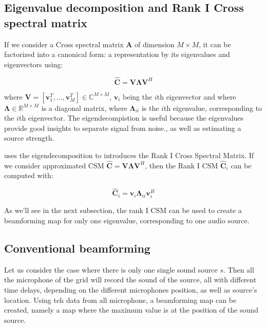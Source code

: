 \documentclass{article}
\begin{document}
\subsection{Eigenvalue decomposition and Rank I Cross spectral matrix}

If we consider a Cross spectral matrix $\mathbf{A}$ of dimension $M \times M$, it can be factorized into a canonical form: a representation by its eigenvalues and eigenvectors using:

\begin{equation}
    \hat{\mathbf{C}} = \mathbf{V} \mathbf{\Lambda} \mathbf{V}^H
\end{equation}

where $\mathbf{V} = [\mathbf{v}_1^T, \dots, \mathbf{v}_M^T] \in \mathbb{C}^{M \times M}$, $\mathbf{v}_i$ being the $i$th eigenvector and where $\mathbf{\Lambda} \in \mathbb{R}^{M \times M}$ is a diagonal matrix, where $\mathbf{\Lambda}_{ii}$ is the $i$th eigenvalue, corresponding to the $i$th eigenvector. The eigendecompistion is useful because the eigenvalues provide good insights to separate signal from noise., as well as estimating a source strength. 

\cite{sarradj2010fast} uses the eigendecomposition to introduces the Rank I Cross Spectral Matrix. If we consider approximated CSM $\hat{\mathbf{C}} = \mathbf{V} \mathbf{\Lambda} \mathbf{V}^H$, then the Rank I CSM $\hat{\mathbf{C}}_i$ can be computed with:

\begin{equation}
    \label{rank_I_csm}
    \hat{\mathbf{C}}_i = \mathbf{v}_i \mathbf{\Lambda}_{ii} \mathbf{v}_{i}^{H}
\end{equation}

As we'll see in the next subsection, the rank I CSM can be used to create a beamforming map for only one eigenvalue, corresponding to one audio source. 


\subsection{Conventional beamforming}

Let us consider the case where there is only one single sound source $s$. Then all the microphone of the grid will record the sound of the source, all with different time delays, depending on the different microphones position, as well as source's location. Using teh data from all microphone, a beamforming map can be created, namely a map where the maximum value is at the position of the sound source.
\end{document}
